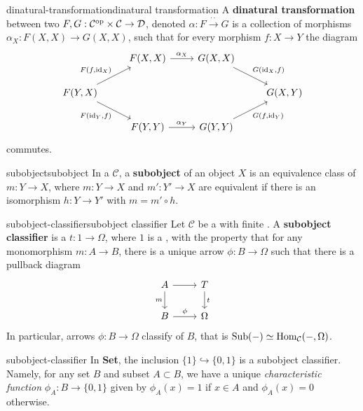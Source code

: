 \begin{topic}{dinatural-transformation}{dinatural transformation}
    A \textbf{dinatural transformation} between two  $F, G : \mathcal{C}^\textup{op} \times \mathcal{C} \to \mathcal{D}$, denoted $\alpha : F \xrightarrow{\cdot\cdot} G$ is a collection of morphisms $\alpha_X : F(X, X) \to G(X, X)$, such that for every morphism $f : X \to Y$ the diagram
    \[ \begin{tikzcd} & F(X, X) \arrow{r}{\alpha_X} & G(X, X) \arrow{dr}{G(\id_X, f)} & \\ F(Y, X) \arrow{ur}{F(f, \id_X)} \arrow[swap]{dr}{F(\id_Y, f)} & & & G(X, Y) \\ & F(Y, Y) \arrow{r}{\alpha_Y} & G(Y, Y) \arrow[swap]{ur}{G(f, \id_Y)} & \end{tikzcd} \]
    commutes.
\end{topic}

\begin{topic}{subobject}{subobject}
    In a  $\mathcal{C}$, a \textbf{subobject} of an object $X$ is an equivalence class of  $m : Y \to X$, where $m : Y \to X$ and $m' : Y' \to X$ are equivalent if there is an isomorphism $h : Y \to Y'$ with $m = m' \circ h$.
\end{topic}

\begin{topic}{subobject-classifier}{subobject classifier}
    Let $\mathcal{C}$ be a  with finite . A \textbf{subobject classifier} is a  $t : 1 \to \Omega$, where $1$ is a , with the property that for any monomorphism $m : A \to B$, there is a unique arrow $\phi : B \to \Omega$ such that there is a pullback diagram
    \[ \begin{tikzcd} A \arrow[swap]{d}{m} \arrow{r} & T \arrow{d}{t} \\ B \arrow{r}{\phi} & \Omega \end{tikzcd} \]
    In particular, arrows $\phi : B \to \Omega$ classify  of $B$, that is $\textup{Sub}(-) \simeq \text{Hom}_\mathcal{C}(-, \Omega)$.
\end{topic}

\begin{example}{subobject-classifier}
    In \textbf{Set}, the inclusion $\{ 1 \} \hookrightarrow \{ 0, 1 \}$ is a subobject classifier. Namely, for any set $B$ and subset $A \subset B$, we have a unique \textit{characteristic function} $\phi_A : B \to \{ 0, 1 \}$ given by $\phi_A(x) = 1$ if $x \in A$ and $\phi_A(x) = 0$ otherwise.
\end{example}

